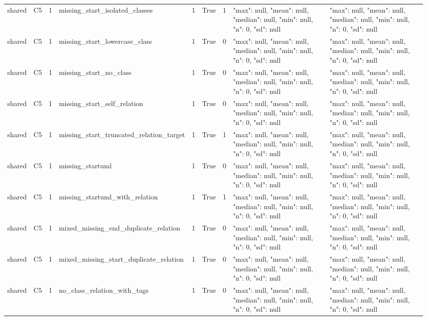 \begin{tabular}{lllllllll}
shared & C5 & 1 & missing\_start\_isolated\_classes & 1 & True & 1 & {"max": null, "mean": null, "median": null, "min": null, "n": 0, "sd": null} & {"max": null, "mean": null, "median": null, "min": null, "n": 0, "sd": null} \\
shared & C5 & 1 & missing\_start\_lowercase\_class & 1 & True & 0 & {"max": null, "mean": null, "median": null, "min": null, "n": 0, "sd": null} & {"max": null, "mean": null, "median": null, "min": null, "n": 0, "sd": null} \\
shared & C5 & 1 & missing\_start\_no\_class & 1 & True & 0 & {"max": null, "mean": null, "median": null, "min": null, "n": 0, "sd": null} & {"max": null, "mean": null, "median": null, "min": null, "n": 0, "sd": null} \\
shared & C5 & 1 & missing\_start\_self\_relation & 1 & True & 0 & {"max": null, "mean": null, "median": null, "min": null, "n": 0, "sd": null} & {"max": null, "mean": null, "median": null, "min": null, "n": 0, "sd": null} \\
shared & C5 & 1 & missing\_start\_truncated\_relation\_target & 1 & True & 1 & {"max": null, "mean": null, "median": null, "min": null, "n": 0, "sd": null} & {"max": null, "mean": null, "median": null, "min": null, "n": 0, "sd": null} \\
shared & C5 & 1 & missing\_startuml & 1 & True & 0 & {"max": null, "mean": null, "median": null, "min": null, "n": 0, "sd": null} & {"max": null, "mean": null, "median": null, "min": null, "n": 0, "sd": null} \\
shared & C5 & 1 & missing\_startuml\_with\_relation & 1 & True & 1 & {"max": null, "mean": null, "median": null, "min": null, "n": 0, "sd": null} & {"max": null, "mean": null, "median": null, "min": null, "n": 0, "sd": null} \\
shared & C5 & 1 & mixed\_missing\_end\_duplicate\_relation & 1 & True & 0 & {"max": null, "mean": null, "median": null, "min": null, "n": 0, "sd": null} & {"max": null, "mean": null, "median": null, "min": null, "n": 0, "sd": null} \\
shared & C5 & 1 & mixed\_missing\_start\_duplicate\_relation & 1 & True & 0 & {"max": null, "mean": null, "median": null, "min": null, "n": 0, "sd": null} & {"max": null, "mean": null, "median": null, "min": null, "n": 0, "sd": null} \\
shared & C5 & 1 & no\_class\_relation\_with\_tags & 1 & True & 0 & {"max": null, "mean": null, "median": null, "min": null, "n": 0, "sd": null} & {"max": null, "mean": null, "median": null, "min": null, "n": 0, "sd": null} \\

\end{tabular}
